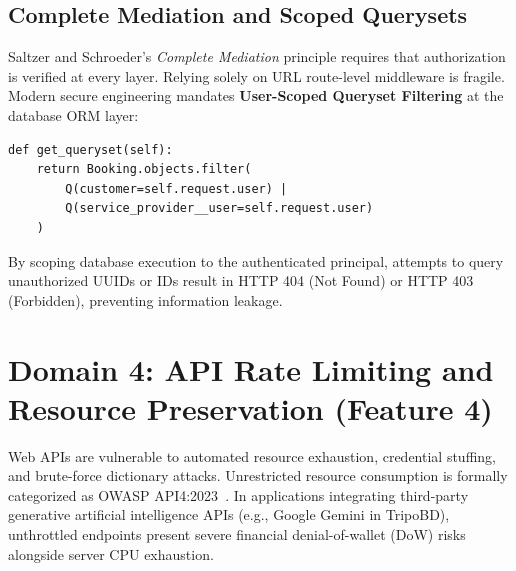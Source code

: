 \documentclass[10pt,twocolumn,a4paper]{article}
\begin{document}
\subsection{Complete Mediation and Scoped Querysets}
Saltzer and Schroeder's \textit{Complete Mediation} principle requires that authorization is verified at every layer. Relying solely on URL route-level middleware is fragile. Modern secure engineering mandates \textbf{User-Scoped Queryset Filtering} at the database ORM layer:
\begin{verbatim}
def get_queryset(self):
    return Booking.objects.filter(
        Q(customer=self.request.user) |
        Q(service_provider__user=self.request.user)
    )
\end{verbatim}
By scoping database execution to the authenticated principal, attempts to query unauthorized UUIDs or IDs result in HTTP 404 (Not Found) or HTTP 403 (Forbidden), preventing information leakage.

\section{Domain 4: API Rate Limiting and Resource Preservation (Feature 4)}
\label{sec:ratelimit}
Web APIs are vulnerable to automated resource exhaustion, credential stuffing, and brute-force dictionary attacks. Unrestricted resource consumption is formally categorized as OWASP API4:2023~\cite{owasp_api_2023}. In applications integrating third-party generative artificial intelligence APIs (e.g., Google Gemini in TripoBD), unthrottled endpoints present severe financial denial-of-wallet (DoW) risks alongside server CPU exhaustion.
\end{document}
